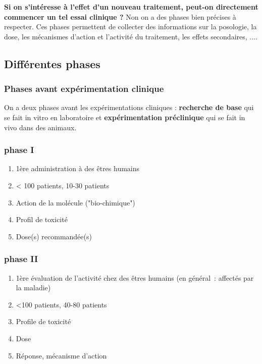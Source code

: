 \textbf{Si on s’intéresse à l’effet d’un nouveau traitement, peut-on directement commencer un tel essai clinique ?}
 Non on a des phases bien précises à respecter. Ces phases permettent de collecter des informations sur la posologie, la dose, les mécanismes d'action et l'activité du traitement, les effets secondaires, ....
 
 \subsection{Différentes phases}
 \subsubsection{Phases avant expérimentation clinique}
 On a deux phases avant les expérimentations cliniques : \textbf{recherche de base} qui se fait in vitro en laboratoire et \textbf{expérimentation préclinique} qui se fait in vivo dans des animaux.
 
\subsubsection{phase I}

\begin{enumerate}
    \item 1ère administration à des êtres humains 
    \item < 100 patients, 10-30 patients
    \item Action de la molécule ("bio-chimique") 
    \item Profil de toxicité
    \item Dose(s) recommandée(s)
\end{enumerate}

\subsubsection{phase II}

\begin{enumerate}
    \item  1ère évaluation de l’activité chez des êtres humains (en général : affectés par la maladie)
    \item<100 patients, 40-80 patients
    \item Profile de toxicité
    \item Dose
    \item Réponse, mécanisme d’action
\end{enumerate}

